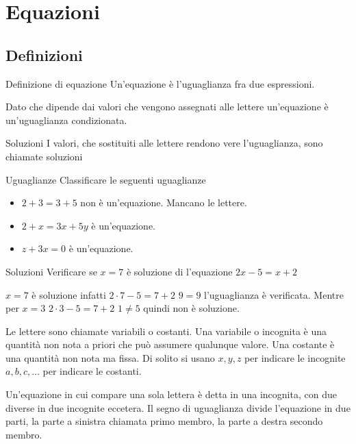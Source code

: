 \chapter{Equazioni}
\label{sec:equazioni}
\section{Definizioni}
\begin{definizionet}{Definizione di equazione}{}
Un'equazione è l'uguaglianza fra due espressioni.
\end{definizionet}
 Dato che dipende dai valori che vengono assegnati alle lettere un'equazione è un'uguaglianza condizionata.
\begin{definizionet}{Soluzioni}{}
  I valori, che sostituiti alle lettere rendono vere l'uguaglianza,  sono chiamate soluzioni
\end{definizionet}
\begin{esempiot}{Uguaglianze}{}
Classificare le seguenti uguaglianze
\end{esempiot}
\begin{itemize}
\item $2+3=3+5$ non è un'equazione. Mancano le lettere.
\item $2+x=3x+5y$ è un'equazione. 
\item $z+3x=0$ è un'equazione.
\end{itemize}
\begin{esempiot}{Soluzioni}{}
Verificare se $x=7$ è soluzione di
 l'equazione $2x-5=x+2$ 
\end{esempiot} 
 $x=7$ è soluzione infatti $2\cdot 7-5=7+2$ $9=9$ l'uguaglianza è verificata. Mentre per $x=3$ $2\cdot 3-5=7+2$ $1\neq5$ quindi non è soluzione.

Le lettere sono chiamate variabili o costanti. Una variabile o incognita è una quantità non nota a priori che può assumere qualunque valore. Una costante è una quantità non nota ma fissa. Di solito si usano $x,y,z$ per indicare le incognite $a,b,c,\dots$ per indicare le costanti.  

Un'equazione in cui compare una sola lettera è detta in una incognita, con due diverse in due incognite eccetera. Il segno di uguaglianza divide l'equazione in due parti, la parte a sinistra chiamata primo membro, la parte a destra secondo membro.
